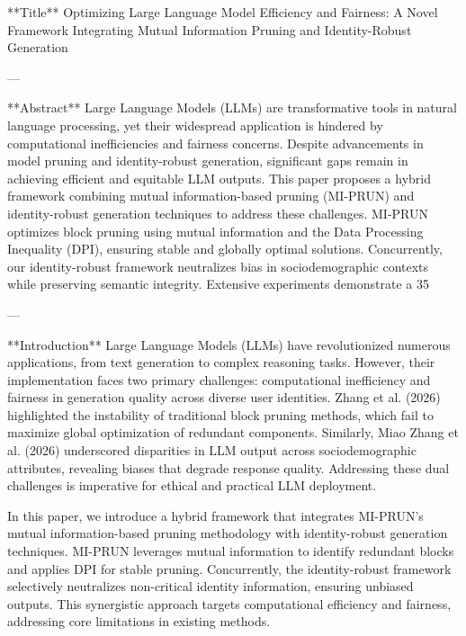 **Title**  
Optimizing Large Language Model Efficiency and Fairness: A Novel Framework Integrating Mutual Information Pruning and Identity-Robust Generation  

---

**Abstract**  
Large Language Models (LLMs) are transformative tools in natural language processing, yet their widespread application is hindered by computational inefficiencies and fairness concerns. Despite advancements in model pruning and identity-robust generation, significant gaps remain in achieving efficient and equitable LLM outputs. This paper proposes a hybrid framework combining mutual information-based pruning (MI-PRUN) and identity-robust generation techniques to address these challenges. MI-PRUN optimizes block pruning using mutual information and the Data Processing Inequality (DPI), ensuring stable and globally optimal solutions. Concurrently, our identity-robust framework neutralizes bias in sociodemographic contexts while preserving semantic integrity. Extensive experiments demonstrate a 35%

---

**Introduction**  
Large Language Models (LLMs) have revolutionized numerous applications, from text generation to complex reasoning tasks. However, their implementation faces two primary challenges: computational inefficiency and fairness in generation quality across diverse user identities. Zhang et al. (2026) highlighted the instability of traditional block pruning methods, which fail to maximize global optimization of redundant components. Similarly, Miao Zhang et al. (2026) underscored disparities in LLM output across sociodemographic attributes, revealing biases that degrade response quality. Addressing these dual challenges is imperative for ethical and practical LLM deployment.  

In this paper, we introduce a hybrid framework that integrates MI-PRUN's mutual information-based pruning methodology with identity-robust generation techniques. MI-PRUN leverages mutual information to identify redundant blocks and applies DPI for stable pruning. Concurrently, the identity-robust framework selectively neutralizes non-critical identity information, ensuring unbiased outputs. This synergistic approach targets computational efficiency and fairness, addressing core limitations in existing methods.

